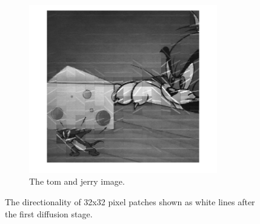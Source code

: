 \begin{figure}
	\begin{subfigure}[b]{0.3\textwidth}
		\centering
		\includegraphics[clip, trim=2cm 0cm 2cm 0cm, width=0.9\textwidth]{figures/tomandjerry-32x32}
		\caption{The tom and jerry image.}
		\label{fig:spiral}
	\end{subfigure}
	
	\caption{The directionality of 32x32 pixel patches shown as white lines after the first diffusion stage.}
	\label{fig:directionality}
\end{figure}